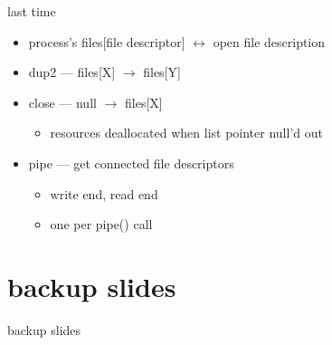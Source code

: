 \date{}
\title{}
\date{}

\begin{frame}
    \titlepage
\end{frame}



\begin{frame}{last time}
    \begin{itemize}
    \item process's files[file descriptor] $\leftrightarrow$ open file description
    \item dup2 --- files[X] $\rightarrow$ files[Y]
    \item close --- null $\rightarrow$ files[X]
        \begin{itemize}
        \item resources deallocated when list pointer null'd out
        \end{itemize}
    \item pipe --- get connected file descriptors
        \begin{itemize}
        \item write end, read end
        \item one per pipe() call
        \end{itemize}
    \end{itemize}
\end{frame}




\section{backup slides}
\begin{frame}{backup slides}
\end{frame}



